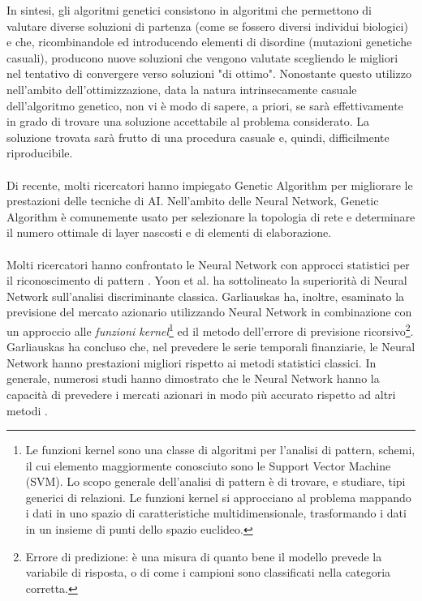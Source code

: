 \documentclass[a4paper,12pt]{report}
\begin{document}
In sintesi, gli algoritmi genetici consistono in algoritmi che permettono di valutare diverse soluzioni di partenza (come se fossero diversi individui biologici) e che, ricombinandole  ed introducendo elementi di disordine (mutazioni genetiche casuali), producono nuove soluzioni che vengono valutate scegliendo le migliori nel tentativo di convergere verso soluzioni "di ottimo". Nonostante questo utilizzo nell'ambito dell'ottimizzazione, data la natura intrinsecamente casuale dell'algoritmo genetico, non vi è modo di sapere, a priori, se sarà effettivamente in grado di trovare una soluzione accettabile al problema considerato. La soluzione trovata sarà frutto di una procedura casuale e, quindi, difficilmente riproducibile. 
\\~\\
Di recente, molti ricercatori hanno impiegato Genetic Algorithm per migliorare le prestazioni delle tecniche di AI. Nell'ambito delle Neural Network, Genetic Algorithm  è comunemente usato per selezionare la topologia di rete e determinare il numero ottimale di layer nascosti e di elementi di elaborazione.\\~\\
Molti ricercatori hanno confrontato le Neural Network con approcci statistici per il riconoscimento di pattern \cite{nng}\cite{nns}. Yoon et al. \cite{nny} ha sottolineato la superiorità di Neural Network sull'analisi discriminante classica. Garliauskas \cite{nng} ha, inoltre, esaminato la previsione del mercato azionario utilizzando Neural Network in combinazione con un approccio alle \textit{funzioni kernel}\footnote{Le funzioni kernel sono una classe di algoritmi per l'analisi di pattern, schemi, il cui elemento maggiormente conosciuto sono le Support Vector Machine (SVM). Lo scopo generale dell'analisi di pattern è di trovare, e studiare, tipi generici di relazioni. Le funzioni kernel si approcciano al problema mappando i dati in uno spazio di caratteristiche multidimensionale, trasformando i dati in un insieme di punti dello spazio euclideo.} ed il metodo dell'errore di previsione ricorsivo\footnote{Errore di predizione: è una misura di quanto bene il modello prevede la variabile di risposta, o di come i campioni sono classificati nella categoria corretta.}.\\
Garliauskas \cite{nng} ha concluso che, nel prevedere le serie temporali finanziarie, le Neural Network hanno prestazioni migliori rispetto ai metodi statistici classici. In generale, numerosi studi hanno dimostrato che le Neural Network hanno la capacità di prevedere i mercati azionari in modo più accurato rispetto ad altri metodi \cite{nny}\cite{nnk}\cite{nnp}\cite{nns2}.
\end{document}
